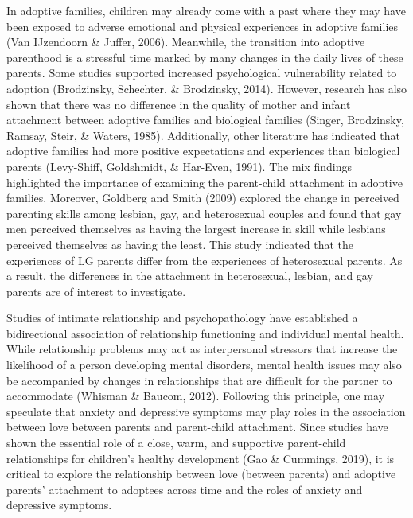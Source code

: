 \documentclass[man]{apa6}
\begin{document}
In adoptive families, children may already come with a past where they may have been exposed to adverse emotional and physical experiences in adoptive families (Van IJzendoorn \& Juffer, 2006). Meanwhile, the transition into adoptive parenthood is a stressful time marked by many changes in the daily lives of these parents. Some studies supported increased psychological vulnerability related to adoption (Brodzinsky, Schechter, \& Brodzinsky, 2014). However, research has also shown that there was no difference in the quality of mother and infant attachment between adoptive families and biological families (Singer, Brodzinsky, Ramsay, Steir, \& Waters, 1985). Additionally, other literature has indicated that adoptive families had more positive expectations and experiences than biological parents (Levy-Shiff, Goldshmidt, \& Har-Even, 1991). The mix findings highlighted the importance of examining the parent-child attachment in adoptive families. Moreover, Goldberg and Smith (2009) explored the change in perceived parenting skills among lesbian, gay, and heterosexual couples and found that gay men perceived themselves as having the largest increase in skill while lesbians perceived themselves as having the least. This study indicated that the experiences of LG parents differ from the experiences of heterosexual parents. As a result, the differences in the attachment in heterosexual, lesbian, and gay parents are of interest to investigate.

Studies of intimate relationship and psychopathology have established a bidirectional association of relationship functioning and individual mental health. While relationship problems may act as interpersonal stressors that increase the likelihood of a person developing mental disorders, mental health issues may also be accompanied by changes in relationships that are difficult for the partner to accommodate (Whisman \& Baucom, 2012). Following this principle, one may speculate that anxiety and depressive symptoms may play roles in the association between love between parents and parent-child attachment. Since studies have shown the essential role of a close, warm, and supportive parent-child relationships for children's healthy development (Gao \& Cummings, 2019), it is critical to explore the relationship between love (between parents) and adoptive parents' attachment to adoptees across time and the roles of anxiety and depressive symptoms.
\end{document}
